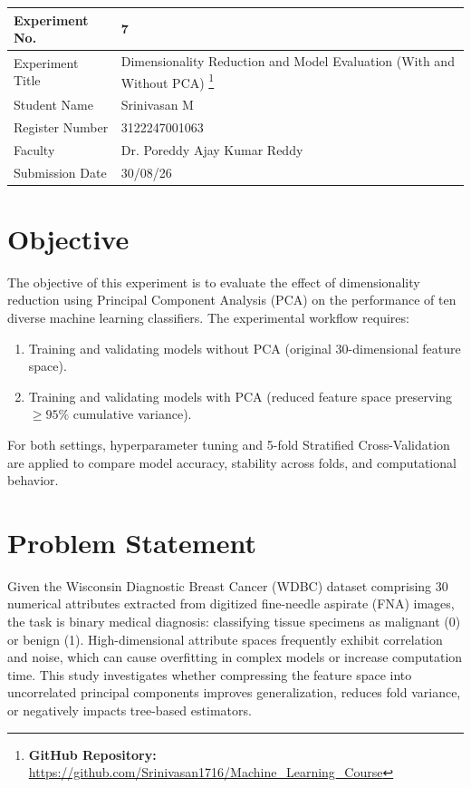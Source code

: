 \documentclass[12pt,a4paper]{article}
\begin{document}
\begin{tabular}{|p{4cm}|p{11cm}|}
\hline
Experiment No. & 7 \\ \hline
Experiment Title & Dimensionality Reduction and Model Evaluation (With and Without PCA)
\footnote{\textbf{GitHub Repository: }\url{https://github.com/Srinivasan1716/Machine_Learning_Course}}\\ \hline
Student Name & Srinivasan M \\ \hline
Register Number & 3122247001063 \\ \hline
Faculty & Dr. Poreddy Ajay Kumar Reddy \\ \hline
Submission Date & 30/08/26 \\ \hline
\end{tabular}

\section{Objective}
The objective of this experiment is to evaluate the effect of dimensionality reduction using Principal Component Analysis (PCA) on the performance of ten diverse machine learning classifiers. The experimental workflow requires:
\begin{enumerate}[label=\alph*)]
\item Training and validating models without PCA (original 30-dimensional feature space).
\item Training and validating models with PCA (reduced feature space preserving $\ge 95\%$ cumulative variance).
\end{enumerate}
For both settings, hyperparameter tuning and 5-fold Stratified Cross-Validation are applied to compare model accuracy, stability across folds, and computational behavior.

\section{Problem Statement}
Given the Wisconsin Diagnostic Breast Cancer (WDBC) dataset comprising 30 numerical attributes extracted from digitized fine-needle aspirate (FNA) images, the task is binary medical diagnosis: classifying tissue specimens as malignant (0) or benign (1). High-dimensional attribute spaces frequently exhibit correlation and noise, which can cause overfitting in complex models or increase computation time. This study investigates whether compressing the feature space into uncorrelated principal components improves generalization, reduces fold variance, or negatively impacts tree-based estimators.
\end{document}
